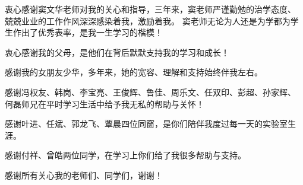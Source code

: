 

\begin{ack}
  衷心感谢窦文华老师对我的关心和指导，三年来，窦老师严谨勤勉的治学态度、
  兢兢业业的工作作风深深感染着我，激励着我。
  窦老师无论为人还是为学都为学生作出了优秀表率，是我一生学习的楷模！

  衷心感谢我的父母，是他们在背后默默支持我的学习和成长！

  感谢我的女朋友少华，多年来，她的宽容、理解和支持始终伴我左右。

  感谢冯权友、韩岗、李宝亮、王俊辉、鲁佳、周乐文、任双印、彭超、孙家辉、
  何磊师兄在平时学习生活中给予我无私的帮助与关怀！

  感谢叶进、任斌、郭龙飞、覃晨四位同窗，是你们陪伴我度过每一天的实验室生涯。

  感谢付祥、曾皓两位同学，在学习上你们给了我很多帮助与支持。

  感谢所有关心我的老师们、同学们，谢谢！
\end{ack}
